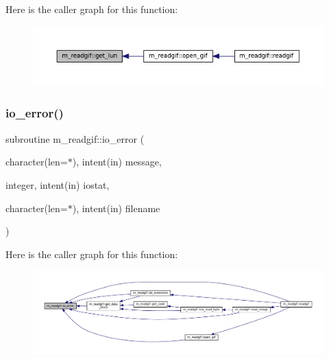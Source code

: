 Here is the caller graph for this function\+:\nopagebreak
\begin{figure}[H]
\begin{center}
\leavevmode
\includegraphics[width=350pt]{namespacem__readgif_a7109d632cddcb8d66729d25bbed5c33c_icgraph}
\end{center}
\end{figure}
\mbox{\label{namespacem__readgif_ae01d3edbe9e15bf4dd33070581e26fee}} 
\subsubsection{\texorpdfstring{io\+\_\+error()}{io\_error()}}
{\footnotesize\ttfamily subroutine m\+\_\+readgif\+::io\+\_\+error (\begin{DoxyParamCaption}\item[{character(len=$\ast$), intent(in)}]{message,  }\item[{integer, intent(in)}]{iostat,  }\item[{character(len=$\ast$), intent(in)}]{filename }\end{DoxyParamCaption})\hspace{0.3cm}{\ttfamily [private]}}

Here is the caller graph for this function\+:\nopagebreak
\begin{figure}[H]
\begin{center}
\leavevmode
\includegraphics[width=350pt]{namespacem__readgif_ae01d3edbe9e15bf4dd33070581e26fee_icgraph}
\end{center}
\end{figure}
\mbox{\label{namespacem__readgif_a314e657d0662360266bac5702a657ef1}} 
